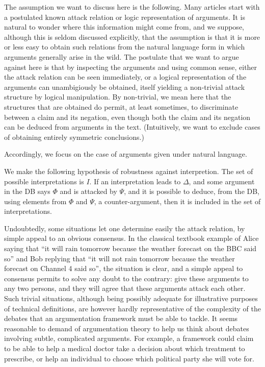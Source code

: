 \documentclass[version=3.21, pagesize, twoside=off, bibliography=totoc, DIV=calc, fontsize=12pt, a4paper, french, english]{scrartcl}
\begin{document}
The assumption we want to discuss here is the following.
Many articles start with a postulated known attack relation or logic representation of arguments. It is natural to wonder where this information might come from, and we suppose, although this is seldom discussed explicitly, that the assumption is that it is more or less easy to obtain such relations from the natural language form in which arguments generally arise in the wild. 
The postulate that we want to argue against here is that by inspecting the arguments and using common sense, either the attack relation can be seen immediately, or a logical representation of the arguments can unambigiously be obtained, itself yielding a non-trivial attack structure by logical manipulation.
By non-trivial, we mean here that the structures that are obtained do permit, at least sometimes, to discriminate between a claim and its negation, even though both the claim and its negation can be deduced from arguments in the text. (Intuitively, we want to exclude cases of obtaining entirely symmetric conclusions.)

Accordingly, we focus on the case of arguments given under natural language. 

We make the following hypothesis of robustness against interpretion. The set of possible interpretations is $I$. If an interpretation leads to $\Delta$, and some argument in the DB says $\Phi$ and is attacked by $\Psi$, and it is possible to deduce, from the DB, using elements from $\Phi$ and $\Psi$, a counter-argument, then it is included in the set of interpretations.

Undoubtedly, some situations let one determine easily the attack relation, by simple appeal to an obvious consensus. In the classical textbook example of Alice saying that “it will rain tomorrow because the weather forecast on the BBC said so” and Bob replying that “it will not rain tomorrow because the weather forecast on Channel 4 said so”, the situation is clear, and a simple appeal to consensus permits to solve any doubt to the contrary: give these arguments to any two persons, and they will agree that these arguments attack each other. Such trivial situations, although being possibly adequate for illustrative purposes of technical definitions, are however hardly representative of the complexity of the debates that an argumentation framework must be able to tackle. It seems reasonable to demand of argumentation theory to help us think about debates involving subtle, complicated arguments. For example, a framework could claim to be able to help a medical doctor take a decision about which treatment to prescribe, or help an individual to choose which political party she will vote for.
\end{document}
